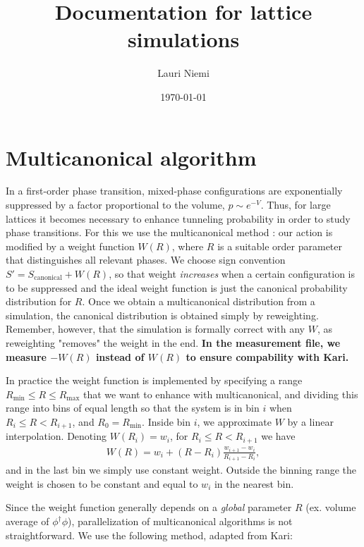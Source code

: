 \documentclass[11pt,a4paper]{article}
\title{Documentation for lattice simulations}
\author{Lauri Niemi}
\date{\today}
\begin{document}
\maketitle


\section{Multicanonical algorithm}

In a first-order phase transition, mixed-phase configurations are exponentially suppressed by a factor proportional to the volume, $p \sim e^{-V}$. Thus, for large lattices it becomes necessary to enhance tunneling probability in order to study phase transitions. For this we use the multicanonical method \cite{Berg:1991cf}: our action is modified by a weight function $W(R)$, where $R$ is a suitable order parameter that distinguishes all relevant phases. We choose sign convention $S' = S_\text{canonical} + W(R)$, so that weight \textit{increases} when a certain configuration is to be suppressed and the ideal weight function is just the canonical probability distribution for $R$. Once we obtain a multicanonical distribution from a simulation, the canonical distribution is obtained simply by reweighting. Remember, however, that the simulation is formally correct with any $W$, as reweighting "removes" the weight in the end. \textbf{In the measurement file, we measure $-W(R)$ instead of $W(R)$ to ensure compability with Kari.}

In practice the weight function is implemented by specifying a range $R_\text{min} \leq R \leq R_\text{max}$ that we want to enhance with multicanonical, and dividing this range into bins of equal length so that the system is in bin $i$ when $R_{i} \leq R < R_{i+1}$, and $R_0 = R_\text{min}$. Inside bin $i$, we approximate $W$ by a linear interpolation. Denoting $W(R_i) = w_i$, for $R_{i} \leq R < R_{i+1}$ we have 
\begin{align}
W(R) = w_i + (R - R_i) \frac{w_{i+1} - w_i}{R_{i+1} - R_i},
\end{align}
and in the last bin we simply use constant weight. Outside the binning range the weight is chosen to be constant and equal to $w_i$ in the nearest bin.

Since the weight function generally depends on a \textit{global} parameter $R$ (ex. volume average of $\phi^\dagger\phi$), parallelization of multicanonical algorithms is not straightforward. We use the following method, adapted from Kari: 
\end{document}
